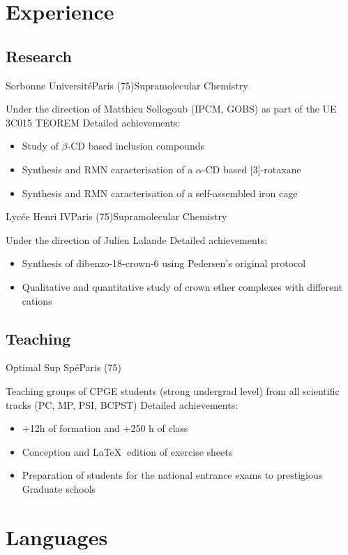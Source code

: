 \documentclass[11pt,a4paper,sans]{moderncv}
\begin{document}
\section{Experience}
%
%
\subsection{Research}
%
%
%
{Sorbonne Université}{Paris (75)}{Supramolecular Chemistry}%
{Under the direction of Matthieu Sollogoub (IPCM, GOBS) as part of the UE 3C015 TEOREM\newline{}%
Detailed achievements:%
\begin{itemize}%
\item Study of $\beta$-CD based inclusion compounds
\item Synthesis and RMN caracterisation of a $\alpha$-CD based [3]-rotaxane
\item Synthesis and RMN caracterisation of a self-assembled iron cage
\end{itemize}
}
%
%
%
{Lycée Henri IV}{Paris (75)}{Supramolecular Chemistry}%
{Under the direction of Julien Lalande \newline{}%
Detailed achievements:%
\begin{itemize}%
\item Synthesis of dibenzo-18-crown-6 using Pedersen's original protocol
\item Qualitative and quantitative study of crown ether complexes with different cations
\end{itemize}
}
%
%
%
\subsection{Teaching}
%
{Optimal Sup Spé}{Paris (75)}{}%
{Teaching groups of CPGE students (strong undergrad level) from all scientific tracks (PC, MP, PSI, BCPST)\newline{}%
Detailed achievements:%
\begin{itemize}%
\item +12h of formation and +250 h of class
\item Conception and {\LaTeX} $~$edition of exercise sheets
\item Preparation of students for the national entrance exams to prestigious Graduate schools
\end{itemize}
}
%
%
%
\section{Languages}
%
%
%
\end{document}

